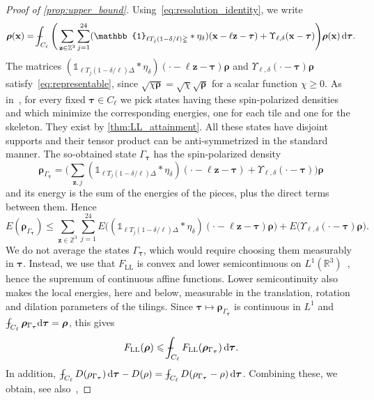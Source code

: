 \documentclass[final,reqno]{amsart}
\theoremstyle{remark}
\renewcommand{\le}{\leqslant}
\renewcommand{\ge}{\geqslant}
\newcommand{\RR}{\mathbb{R}}
\newcommand{\ZZ}{\mathbb{Z}}
\newcommand{\LL}{\mathrm{LL}}
\newcommand{\iden}{\mathbb{1}}
\newcommand{\tetra}{\mathbb{\Delta}}
\newcommand{\dd}{\mathrm{d}}
\def\Xint#1{\mathchoice
{\XXint\displaystyle\textstyle{#1}}
{\XXint\textstyle\scriptstyle{#1}}
{\XXint\scriptstyle\scriptscriptstyle{#1}}
{\XXint\scriptscriptstyle\scriptscriptstyle{#1}}
\!\int}
\def\XXint#1#2#3{{\setbox0=\hbox{$#1{#2#3}{\int}$ }
\vcenter{\hbox{$#2#3$ }}\kern-.6\wd0}}
\def\dashint{\Xint-}
\begin{document}
\begin{proof}[Proof of \cref{prop:upper_bound}]
Using~\cref{eq:resolution_identity}, we write
\begin{equation*}
\bm{\rho}(\mathbf{x})=\dashint_{C_\ell}\Bigg(\sum_{\mathbf{z}\in\ZZ^3}\sum_{j=1}^{24} (\iden_{\ell T_j(1-\delta/\ell)\tetra}\ast\eta_\delta)(\mathbf{x}-\ell \mathbf{z}-\bm{\tau})+\Upsilon_{\ell,\delta}(\mathbf{x}-\bm{\tau})\Bigg)\bm{\rho}(\mathbf{x})\,\dd\bm{\tau}.
\end{equation*}
The matrices $(\iden_{\ell T_j(1-\delta/\ell)\tetra}\ast\eta_\delta)(\cdot-\ell \mathbf{z}-\bm{\tau})\bm{\rho}$ and $\Upsilon_{\ell,\delta}(\cdot-\bm{\tau})\bm{\rho}$ satisfy~\cref{eq:representable}, since $\sqrt{\chi \bm{\rho}}=\sqrt\chi\sqrt {\bm{\rho}}$ for a scalar function $\chi\ge0$. As in~\cite{csirik2026non}, for every fixed $\bm{\tau}\in C_\ell$ we pick states having these spin-polarized densities and which minimize the corresponding energies, one for each tile and one for the skeleton. They exist by \cref{thm:LL_attainment}. All these states have disjoint supports and their tensor product can be anti-symmetrized in the standard manner. The so-obtained state $\Gamma_{\bm{\tau}}$ has the spin-polarized density
$$
\bm{\rho}_{\Gamma_{\bm{\tau}}}=\Big(\sum_{\mathbf{z},j}(\iden_{\ell T_j(1-\delta/\ell)\tetra}\ast\eta_\delta)(\cdot-\ell \mathbf{z}-\bm{\tau})+\Upsilon_{\ell,\delta}(\cdot-\bm{\tau})\Big)\bm{\rho}
$$
and its energy is the sum of the energies of the pieces, plus the direct terms between them. Hence
$$
E(\bm{\rho}_{\Gamma_{\bm{\tau}}})\le\sum_{\mathbf{z}\in\ZZ^3}\sum_{j=1}^{24} E\big((\iden_{\ell T_j(1-\delta/\ell)\tetra}\ast\eta_\delta)(\cdot-\ell \mathbf{z}-\bm{\tau})\bm{\rho}\big)+E\big(\Upsilon_{\ell,\delta}(\cdot-\bm{\tau})\bm{\rho}\big).
$$
We do not average the states $\Gamma_{\bm{\tau}}$, which would require choosing them measurably in $\bm{\tau}$. Instead, we use that $F_\LL$ is convex and lower semicontinuous on $L^1(\RR^3)$~\cite{lieb1983density}, hence the supremum of continuous affine functions. Lower semicontinuity also makes the local energies, here and below, measurable in the translation, rotation and dilation parameters of the tilings. Since $\bm{\tau}\mapsto\bm{\rho}_{\Gamma_{\bm{\tau}}}$ is continuous in $L^1$ and $\dashint_{C_\ell}\bm{\rho}_{\Gamma_{\bm{\tau}}}\dd\bm{\tau}=\bm{\rho}$, this gives
$$
F_\LL(\bm{\rho})\le\dashint_{C_\ell}F_\LL(\bm{\rho}_{\Gamma_{\bm{\tau}}})\,\dd\bm{\tau}.
$$
In addition, $\dashint_{C_\ell}D(\rho_{\Gamma_{\bm{\tau}}})\,\dd\bm{\tau}-D(\rho)=\dashint_{C_\ell}D(\rho_{\Gamma_{\bm{\tau}}}-\rho)\,\dd\bm{\tau}$. Combining these, we obtain, see also~\cite[Eq. (37)]{lewin2020local},

\end{proof}
\end{document}
